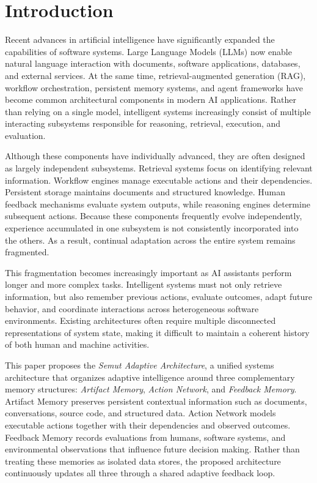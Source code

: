 \section{Introduction}

Recent advances in artificial intelligence have significantly expanded the capabilities of software systems. Large Language Models (LLMs) now enable natural language interaction with documents, software applications, databases, and external services. At the same time, retrieval-augmented generation (RAG), workflow orchestration, persistent memory systems, and agent frameworks have become common architectural components in modern AI applications. Rather than relying on a single model, intelligent systems increasingly consist of multiple interacting subsystems responsible for reasoning, retrieval, execution, and evaluation.

Although these components have individually advanced, they are often designed as largely independent subsystems. Retrieval systems focus on identifying relevant information. Workflow engines manage executable actions and their dependencies. Persistent storage maintains documents and structured knowledge. Human feedback mechanisms evaluate system outputs, while reasoning engines determine subsequent actions. Because these components frequently evolve independently, experience accumulated in one subsystem is not consistently incorporated into the others. As a result, continual adaptation across the entire system remains fragmented.

This fragmentation becomes increasingly important as AI assistants perform longer and more complex tasks. Intelligent systems must not only retrieve information, but also remember previous actions, evaluate outcomes, adapt future behavior, and coordinate interactions across heterogeneous software environments. Existing architectures often require multiple disconnected representations of system state, making it difficult to maintain a coherent history of both human and machine activities.

This paper proposes the \emph{Semut Adaptive Architecture}, a unified systems architecture that organizes adaptive intelligence around three complementary memory structures: \emph{Artifact Memory}, \emph{Action Network}, and \emph{Feedback Memory}. Artifact Memory preserves persistent contextual information such as documents, conversations, source code, and structured data. Action Network models executable actions together with their dependencies and observed outcomes. Feedback Memory records evaluations from humans, software systems, and environmental observations that influence future decision making. Rather than treating these memories as isolated data stores, the proposed architecture continuously updates all three through a shared adaptive feedback loop.

